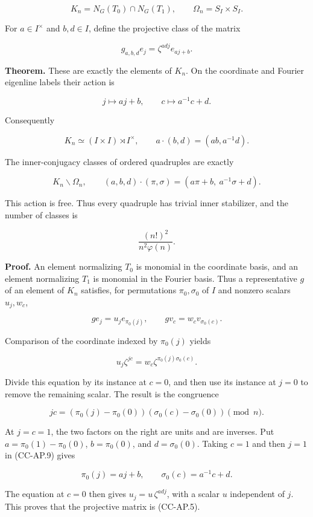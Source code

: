 \documentclass[11pt,a4paper]{article}
\theoremstyle{definition}\newtheorem{definition}[theorem]{Definition}
\theoremstyle{remark}\newtheorem{remark}[theorem]{Remark}
\begin{document}
\[
 K_n=N_G(T_0)\cap N_G(T_1),\qquad
 \Omega_n=S_I\times S_I.
\]

For \(a\in I^\times\) and \(b,d\in I\), define the projective class of
the matrix

\[
 g_{a,b,d}e_j=\zeta^{ad j}e_{aj+b}.
 \tag{CC-AP.5}
\]

\textbf{Theorem.} These are exactly the elements of \(K_n\). On the
coordinate and Fourier eigenline labels their action is

\[
 j\longmapsto aj+b,\qquad
 c\longmapsto a^{-1}c+d.
 \tag{CC-AP.6}
\]

Consequently

\[
 K_n\simeq(I\times I)\rtimes I^\times,\qquad
 a\cdot(b,d)=(ab,a^{-1}d).
\]

The inner-conjugacy classes of ordered quadruples are exactly

\[
 K_n\backslash\Omega_n,\qquad
 (a,b,d)\cdot(\pi,\sigma)
 =(a\pi+b,\ a^{-1}\sigma+d).
 \tag{CC-AP.7}
\]

This action is free. Thus every quadruple has trivial inner stabilizer,
and the number of classes is

\[
 \frac{(n!)^2}{n^2\varphi(n)}.
 \tag{CC-AP.8}
\]

\textbf{Proof.} An element normalizing \(T_0\) is monomial in the
coordinate basis, and an element normalizing \(T_1\) is monomial in the
Fourier basis. Thus a representative \(g\) of an element of \(K_n\)
satisfies, for permutations \(\pi_0,\sigma_0\) of \(I\) and nonzero
scalars \(u_j,w_c\),

\[
 ge_j=u_j e_{\pi_0(j)},\qquad
 gv_c=w_c v_{\sigma_0(c)}.
\]

Comparison of the coordinate indexed by \(\pi_0(j)\) yields

\[
 u_j\zeta^{jc}=w_c\zeta^{\pi_0(j)\sigma_0(c)}.
\]

Divide this equation by its instance at \(c=0\), and then use its
instance at \(j=0\) to remove the remaining scalar. The result is the
congruence

\[
 jc=(\pi_0(j)-\pi_0(0))(\sigma_0(c)-\sigma_0(0))
 \pmod n.
 \tag{CC-AP.9}
\]

At \(j=c=1\), the two factors on the right are units and are inverses.
Put \(a=\pi_0(1)-\pi_0(0)\), \(b=\pi_0(0)\), and \(d=\sigma_0(0)\).
Taking \(c=1\) and then \(j=1\) in (CC-AP.9) gives

\[
 \pi_0(j)=aj+b,\qquad \sigma_0(c)=a^{-1}c+d.
\]

The equation at \(c=0\) then gives \(u_j=u\,\zeta^{ad j}\), with a
scalar \(u\) independent of \(j\). This proves that the projective
matrix is (CC-AP.5).
\end{document}
